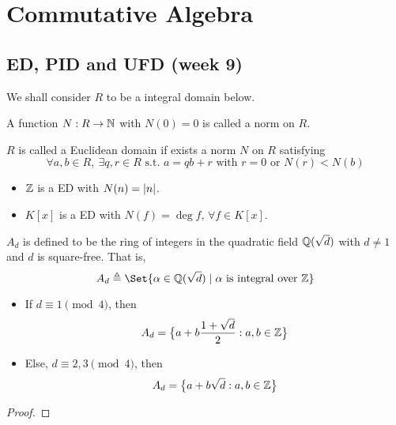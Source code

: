 \section{Commutative Algebra}

\subsection{ED, PID and UFD (week 9)}

We shall consider $R$ to be a integral domain below.
\begin{definition}
  A function $N: R \to \mathbb{N}$ with $N(0) = 0$ is called a norm on $R$.
\end{definition}

\begin{definition}
  $R$ is called a Euclidean domain if exists a norm $N$ on $R$
  satisfying
  \[ \forall a, b \in R, \ \exists q, r \in R \text{ s.t. }
  a = qb + r \text{ with } r = 0 \text{ or } N(r) < N(b) \]
\end{definition}

\begin{example} \hfill
  \begin{itemize}
    \item $\mathbb{Z}$ is a ED with $N(n) = \lvert n\rvert$.
    \item $K[x]$ is a ED with $N(f) = \deg f, \, \forall f \in K[x]$.
  \end{itemize}
\end{example}

\begin{definition}
  $A_d$ is defined to be the ring of integers in the quadratic field $\mathbb{Q}(\sqrt{d})$
  with $d \neq 1$ and $d$ is square-free. That is,
  \[ A_d \triangleq \Set{ \alpha \in \Qb(\sqrt{d}) \mid \alpha \text{ is integral over } \Zb} \]
\end{definition}

\begin{theorem} \hfill
  \begin{itemize}
    \item If $d \equiv 1 \pmod{4}$, then
      \[ A_d = \big\{ a + b \frac{1 + \sqrt{d}}{2} : a, b \in \mathbb{Z} \big\} \]
    \item Else, $d \equiv 2, 3 \pmod{4}$, then
      \[ A_d = \big\{ a + b \sqrt{d} : a, b \in \mathbb{Z} \big\} \]
  \end{itemize}
  \begin{proof}
  \end{proof}
\end{theorem}

